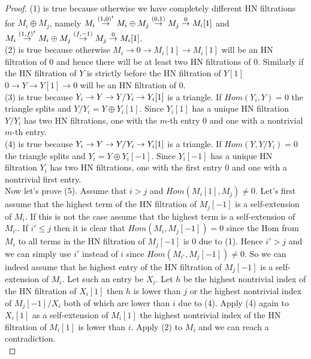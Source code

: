 \begin{proof}
\indent (1) is true because otherwise we have completely different HN filtrations for $M_i\oplus M_j$, namely $M_i\overset{(1,0)^t}{\to} M_i\oplus M_j\overset{(0,1)}{\to} M_j\overset{0}{\to} M_i[1]$ and $M_i\overset{(1,f)^t}{\to} M_i\oplus M_j\overset{(f,-1)}{\to} M_j\overset{0}{\to} M_i[1]$.\\
\indent (2) is true because otherwise $M_i\to 0\to M_i[1]\to M_i[1]$ will be an HN filtration of 0 and hence there will be at least two HN filtrations of 0. Similarly if the HN filtration of $Y$ is strictly before the HN filtration of $Y[1]$ $0\to Y\to Y[1]\to 0$ will be an HN filtration of 0.\\
\indent (3) is true because $Y_i\to Y\to Y/Y_i\to Y_i[1]$ is a triangle. If $Hom(Y_i,Y)= 0$ the triangle splits and $Y/Y_i = Y\oplus Y_i[1]$. Since $Y_i[1]$ has a unique HN filtration $Y/Y_i$ has two HN filtrations, one with the $m$-th entry 0 and one with a nontrivial $m$-th entry. \\
\indent (4) is true because $Y_i\to Y\to Y/Y_i\to Y_i[1]$ is a triangle. If $Hom(Y,Y/Y_i)= 0$ the triangle splits and $Y_i = Y\oplus Y_i[-1]$. Since $Y_i[-1]$ has a unique HN filtration $Y_i$ has two HN filtrations, one with the first entry 0 and one with a nontrivial first entry. \\
\indent Now let's prove (5). Assume that $i>j$ and $Hom(M_i[1],M_j) \neq 0$. Let's first assume that the highest term of the HN filtration of $M_j[-1]$ is a self-extension of $M_i$. If this is not the case assume that the highest term is a self-extension of $M_{i'}$. If $i'\leq j$ then it is clear that $Hom(M_i,M_j[-1])=0$ since the Hom from $M_i$ to all terms in the HN filtration of $M_j[-1]$ is 0 due to (1). Hence $i'>j$ and we can simply use $i'$ instead of $i$ since $Hom(M_{i'},M_j[-1])\neq 0$. So we can indeed assume that he highest entry of the HN filtration of $M_j[-1]$ is a self-extension of $M_i$. Let such an entry be $X_i$. Let $h$ be the highest nontrivial index of the HN filtration of $X_i[1]$ then $h$ is lower than $j$ or the highest nontrivial index of $M_j[-1]/X_i$ both of which are lower than $i$ due to (4). Apply (4) again to $X_i[1]$ as a self-extension of $M_i[1]$ the highest nontrivial index of the HN filtration of $M_i[1]$ is lower than $i$. Apply (2) to $M_i$ and we can reach a contradiction.\\

\end{proof}
